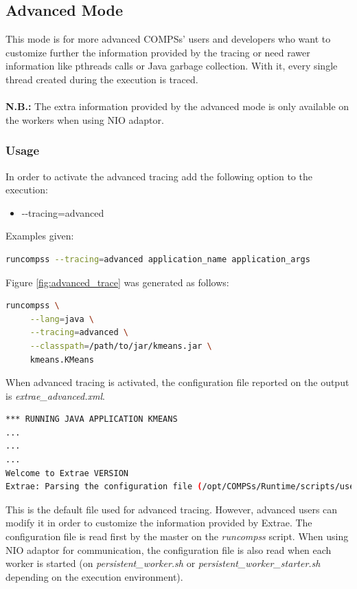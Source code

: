 \subsection{Advanced Mode}
This mode is for more advanced COMPSs' users and developers who want to customize further the information provided by the tracing or need rawer information like pthreads calls or Java garbage collection. With it, every single thread created during the execution is traced.
\\
\\
\textbf{N.B.:} The extra information provided by the advanced mode is only available on the workers when using NIO adaptor.


\subsubsection{Usage}

In order to activate the advanced tracing add the following option to the execution:

\begin{itemize}
 \item -{}-tracing=advanced
\end{itemize}

\noindent Examples given:

\begin{lstlisting}[language=bash]
runcompss --tracing=advanced application_name application_args
\end{lstlisting}

\noindent Figure \ref{fig:advanced_trace} was generated as follows:


\begin{lstlisting}[language=bash]
runcompss \
     --lang=java \
     --tracing=advanced \
     --classpath=/path/to/jar/kmeans.jar \
     kmeans.KMeans
\end{lstlisting}


When advanced tracing is activated, the configuration file reported on the output is \textit{extrae\_advanced.xml}. 

\begin{lstlisting}[language=bash]
*** RUNNING JAVA APPLICATION KMEANS
...
...
...
Welcome to Extrae VERSION
Extrae: Parsing the configuration file (/opt/COMPSs/Runtime/scripts/user/../../configuration/xml/tracing/extrae_advanced.xml) begins
\end{lstlisting}

This is the default file used for advanced tracing. However, advanced users can modify it in order to customize the information provided by Extrae. The configuration file is read first by the master on the \textit{runcompss} script. When using NIO adaptor for communication, the configuration file is also read when each worker is started (on \textit{persistent\_worker.sh} or \textit{persistent\_worker\_starter.sh} depending on the execution environment).

